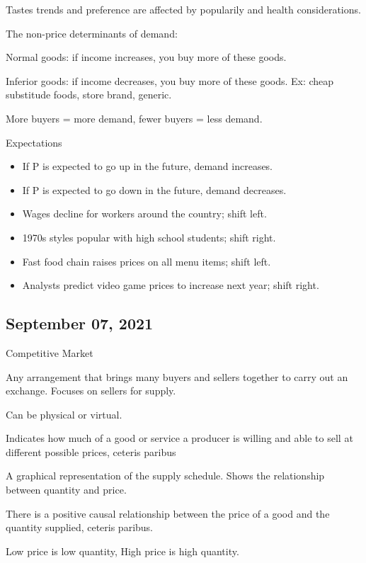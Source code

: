 \documentclass{scrreprt} %
\begin{document}
Tastes trends and preference are affected by popularily and health considerations.

The non-price determinants of demand:

\begin{definition}
	Normal goods: if income increases, you buy more of these goods.

	Inferior goods: if income decreases, you buy more of these goods. Ex: 
	cheap substitude foods, store brand, generic.
\end{definition}

More buyers = more demand, fewer buyers = less demand.

Expectations

\begin{itemize}
	\item If P is expected to go up in the future, demand increases.
	\item If P is expected to go down in the future, demand decreases.
\end{itemize}

\begin{example}
	\begin{itemize}
		\item Wages decline for workers around the country; shift left.
		\item 1970s styles popular with high school students; shift right.
		\item Fast food chain raises prices on all menu items; shift left.
		\item Analysts predict video game prices to increase next year; shift right.
	\end{itemize}
\end{example}

\subsection{September 07, 2021}

\begin{definition}
	Competitive Market

	Any arrangement that brings many buyers and sellers together to
	carry out an exchange. Focuses on sellers for supply.
	
	Can be physical or virtual.
\end{definition}

\begin{definition}
	Indicates how much of a good or service a producer is willing and able
	to sell at different possible prices, ceteris paribus
\end{definition}

\begin{definition}
	A graphical representation of the supply schedule. Shows the relationship
	between quantity and price.
\end{definition}

\begin{definition}
	There is a positive causal relationship between the price of a good and the quantity
	supplied, ceteris paribus.

	Low price is low quantity,
	High price is high quantity.
\end{definition}
\end{document}
